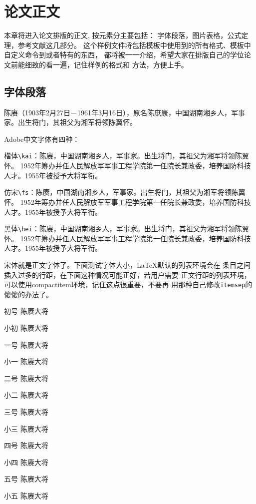 \chapter{论文正文}
\label{chap:main}
本章将进入论文排版的正文, 按元素分主要包括：
{\kai 字体段落，图片表格，公式定理，参考文献}这几部分。
这个样例文件将包括模板中使用到的所有格式、模板中自定义命令到或者特有的东西，
都将被一一介绍，希望大家在排版自己的学位论文前能细致的看一遍，记住样例的格式和
方法，方便上手。

\section{字体段落}
\label{sec:font}

陈赓（1903年2月27日－1961年3月16日），原名陈庶康，中国湖南湘乡人，军事家。出生将门，其祖父为湘军将领陈翼怀。

Adobe中文字体有四种：

{\kai 楷体\verb|\kai|：陈赓，中国湖南湘乡人，军事家。出生将门，其祖父为湘军将领陈翼怀。%
1952年筹办并任人民解放军军事工程学院第一任院长兼政委，培养国防科技人才。1955年被授予大将军衔。}

{\fs 仿宋\verb|\fs|：陈赓，中国湖南湘乡人，军事家。出生将门，其祖父为湘军将领陈翼怀。%
1952年筹办并任人民解放军军事工程学院第一任院长兼政委，培养国防科技人才。1955年被授予大将军衔。}

{\hei 黑体\verb|\hei|：陈赓，中国湖南湘乡人，军事家。出生将门，其祖父为湘军将领陈翼怀。%
1952年筹办并任人民解放军军事工程学院第一任院长兼政委，培养国防科技人才。1955年被授予大将军衔。}

宋体就是正文字体了。下面测试字体大小，\LaTeX{}默认的列表环境会在
条目之间插入过多的行距，在下面这种情况可能正好，若用户需要
{\kai 正文行距}的列表环境，可以使用compactitem环境，记住这点很重要，不要再
用那种自己修改\verb|itemsep|的傻傻的办法了。
\begin{compactitem}
\item[初号] {\song\chuhao 陈赓大将}
\item[小初] {\song\xiaochu 陈赓大将}
\item[一号] {\song\yihao 陈赓大将}
\item[小一] {\song\xiaoyi 陈赓大将}
\item[二号] {\song\erhao 陈赓大将}
\item[小二] {\song\xiaoer 陈赓大将}
\item[三号] {\song\sanhao 陈赓大将}
\item[小三] {\song\xiaosan 陈赓大将}
\item[四号] {\song\sihao 陈赓大将}
\item[小四] {\song\xiaosi 陈赓大将}
\item[五号] {\song\wuhao 陈赓大将}
\item[小五] {\song\xiaowu 陈赓大将}
\end{compactitem}

